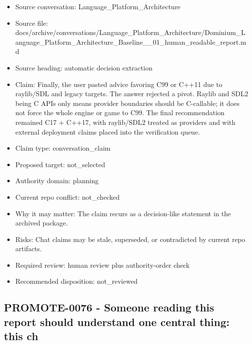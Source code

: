 \documentclass[11pt,a4paper]{report}
\begin{document}
\begin{itemize}
\item Source conversation: Language\_Platform\_Architecture
\item Source file: docs/archive/conversations/Language\_Platform\_Architecture/Dominium\_Language\_Platform\_Architecture\_Baseline\_\_01\_human\_readable\_report.md
\item Source heading: automatic decision extraction
\item Claim: Finally, the user pasted advice favoring C99 or C++11 due to raylib/SDL and legacy targets. The answer rejected a pivot. Raylib and SDL2 being C APIs only means provider boundaries should be C-callable; it does not force the whole engine or game to C99. The final recommendation remained C17 + C++17, with raylib/SDL2 treated as providers and with external deployment claims placed into the verification queue.
\item Claim type: conversation\_claim
\item Proposed target: not\_selected
\item Authority domain: planning
\item Current repo conflict: not\_checked
\item Why it may matter: The claim recurs as a decision-like statement in the archived package.
\item Risks: Chat claims may be stale, superseded, or contradicted by current repo artifacts.
\item Required review: human review plus authority-order check
\item Recommended disposition: not\_reviewed
\end{itemize}

\subsection{PROMOTE-0076 - Someone reading this report should understand one central thing: this ch}
\end{document}
